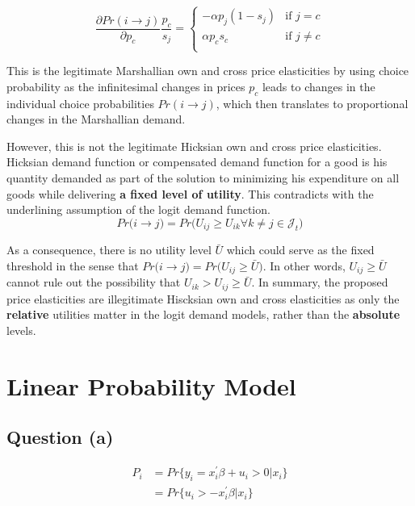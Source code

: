 \documentclass{article}
\begin{document}
\begin{equation*}
\frac{\partial Pr(i \rightarrow j)}{\partial p_c} \frac{p_c}{s_j} = 
\begin{cases}
- \alpha p_j (1 - s_j) & \text{if    } j = c \\
\alpha p_c s_c & \text{if    } j \neq c \\
\end{cases}
\end{equation*}

This is the legitimate Marshallian own and cross price elasticities by using choice probability as the infinitesimal changes in prices $p_c$ leads to changes in the individual choice probabilities $Pr(i \rightarrow j)$, which then translates to proportional changes in the Marshallian demand. 

However, this is not the legitimate Hicksian own and cross price elasticities. Hicksian demand function or compensated demand function for a good is his quantity demanded as part of the solution to minimizing his expenditure on all goods while delivering \textbf{a fixed level of utility}. This contradicts with the underlining assumption of the logit demand function. 
\begin{equation*}
Pr\bigg(i \rightarrow j \bigg) = Pr\bigg( U_{ij} \geq U_{ik} \forall k \neq j \in \mathcal{J}_t \bigg )
\end{equation*}

As a consequence, there is no utility level $\bar U$ which could serve as the fixed threshold in the sense that $Pr\bigg(i \rightarrow j \bigg) = Pr\bigg( U_{ij} \geq \bar U \bigg )$. In other words, $U_{ij} \geq \bar U$ cannot rule out the possibility that $U_{ik} > U_{ij} \geq \bar U$. In summary, the proposed price elasticities are illegitimate Hiscksian own and cross elasticities as only the \textbf{relative} utilities matter in the logit demand models, rather than the \textbf{absolute} levels. 


\section{Linear Probability Model}
\addtolength{\jot}{3pt}

\subsection*{Question (a)}
\begin{equation}
\begin{split}
P_i & = Pr\bigg\{ y_i = x_i^\prime \beta + u_i > 0 \bigg| x_i \bigg\} \\
& = Pr\bigg\{ u_i > - x_i^\prime \beta \bigg| x_i \bigg\} \\
\end{split}
\end{equation}
\end{document}
